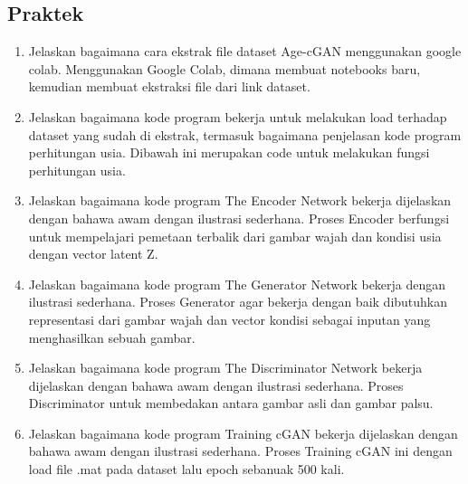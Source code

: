 \subsection{Praktek}
\begin{enumerate}

	\item Jelaskan bagaimana cara ekstrak ﬁle dataset Age-cGAN menggunakan google colab.
Menggunakan Google Colab, dimana membuat notebooks baru, kemudian membuat ekstraksi file dari link dataset.

		

	\item Jelaskan bagaimana kode program bekerja untuk melakukan load terhadap dataset yang sudah di ekstrak, termasuk bagaimana penjelasan kode program perhitungan usia.
Dibawah ini merupakan code untuk melakukan fungsi perhitungan usia.

		

	\item Jelaskan bagaimana kode program The Encoder Network bekerja dijelaskan dengan bahawa awam dengan ilustrasi sederhana.
Proses Encoder berfungsi untuk mempelajari pemetaan terbalik dari gambar wajah dan kondisi usia dengan vector latent Z.

		

	\item Jelaskan bagaimana kode program The Generator Network bekerja  dengan ilustrasi sederhana.
Proses Generator agar bekerja dengan baik dibutuhkan representasi dari gambar wajah dan vector kondisi sebagai inputan yang menghasilkan sebuah gambar.

		

        	\item Jelaskan bagaimana kode program The Discriminator Network bekerja dijelaskan dengan bahawa awam dengan ilustrasi sederhana.
Proses Discriminator untuk membedakan antara gambar asli dan gambar palsu.

		

        	\item Jelaskan bagaimana kode program Training cGAN bekerja dijelaskan dengan bahawa awam dengan ilustrasi sederhana.
Proses Training cGAN ini dengan load file .mat pada dataset lalu epoch sebanuak 500 kali.


\end{enumerate}
